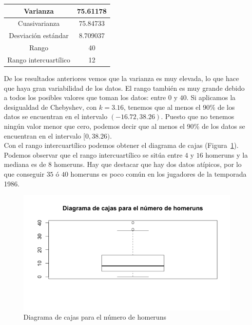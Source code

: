 \documentclass[12pt,a4paper,twoside,openright,titlepage,final]{article}
\begin{document}
\begin{table}[htbp]
\centering
\begin{tabular}{|c|c|}
\hline Varianza & 75.61178 \\ 
\hline Cuasivarianza & 75.84733 \\
\hline Desviación estándar & 8.709037 \\  
\hline Rango & 40  \\ 
\hline Rango intercuartílico & 12  \\ 
\hline 
\end{tabular} 
\end{table}

De los resultados anteriores vemos que la varianza es muy elevada, lo que hace que haya gran variabilidad de los datos. El rango también es muy grande debido a todos los posibles valores que toman los datos: entre $0$ y $40$. Si aplicamos la desigualdad de Chebyshev, con $k = 3.16$, tenemos que al menos el 90\% de los datos se encuentran en el intervalo $(-16.72, 38.26)$. Puesto que no tenemos ningún valor menor que cero, podemos decir que al menos el 90\% de los datos se encuentran en el intervalo $[0, 38.26)$.\\

Con el rango intercuartílico podemos obtener el diagrama de cajas (Figura~\ref{fig:diagrama_cajas_homeruns}). Podemos observar que el rango intercuartílico se sitúa entre $4$ y $16$ homeruns y la mediana es de $8$ homeruns. Hay que destacar que hay dos datos atípicos, por lo que conseguir $35$ ó $40$ homeruns es poco común en los jugadores de la temporada 1986.\\

\begin{figure}[tbph!]
\centering
\includegraphics[width=0.8\linewidth]{imagenes/diagrama_cajas_homeruns}
\caption{Diagrama de cajas para el número de homeruns}
\label{fig:diagrama_cajas_homeruns}
\end{figure}
\end{document}
